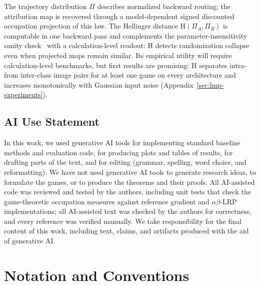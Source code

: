 \documentclass[twoside]{article}
\newif\ifch \chfalse
\newcommand{\ch}[1]{\ifch\textcolor{magenta}{#1}\else#1\fi}
\newcommand{\1}{\mathbf{1}}
\begin{document}
The trajectory distribution $\Pi$ describes normalized backward routing; the attribution map is
recovered through a model-dependent signed discounted occupation projection of this law.
The Hellinger distance $\mathrm{H}(\Pi_A, \Pi_B)$ is computable in one backward pass
\ch{and complements the parameter-insensitivity sanity check~\citep{Adebayo2018sanity,
sixt2020whenexplanationslie} with a calculation-level readout: $\mathrm{H}$ detects randomization
collapse even when projected maps remain similar.}
\ch{Its} empirical utility will require calculation-level benchmarks, but first
results are promising: $\mathrm{H}$ separates intra- from inter-class image pairs for at least one
game on every architecture and increases monotonically with Gaussian input noise
(Appendix~\ref{sec:lmp-experiments}).

\subsection*{AI Use Statement}

In this work, we used generative AI tools for implementing standard baseline methods and evaluation
code, for producing plots and tables of results, for drafting parts of the text, and for editing
(grammar, spelling, word choice, and reformatting).
We have not used generative AI tools to generate research ideas, to formulate the games, or to
produce the theorems and their proofs.
All AI-assisted code was reviewed and tested by the authors, including unit tests that check the
game-theoretic occupation measures against reference gradient and $\alpha\beta$-LRP
implementations; all AI-assisted text was checked by the authors for correctness, and every
reference was verified manually.
We take responsibility for the final content of this work, including text, claims, and artifacts
produced with the aid of generative AI.




\clearpage
\appendix
\thispagestyle{empty}
\onecolumn
{}

\section{Notation and Conventions}\label{app:notation}\label{app:notation-identities}
\end{document}

